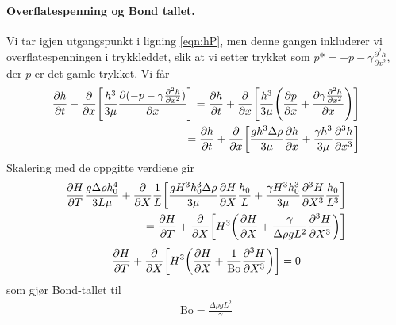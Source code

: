 \documentclass[12p,a4paper]{article}
\begin{document}
\paragraph{Overflatespenning og Bond tallet.}
Vi tar igjen utgangspunkt i ligning \ref{eqn:hP}, men denne gangen inkluderer vi overflatespenningen i trykkleddet, slik at vi setter trykket som $p* = -p -\gamma\frac{\partial^2 h}{\partial x^2}$, der $p$ er det gamle trykket. Vi får
\begin{align*}
    \frac{\partial h}{\partial t} - \frac{\partial}{\partial x}\qty[\frac{h^3}{3\mu}\frac{\partial(-p-\gamma\frac{\partial^2 h}{\partial x^2})}{\partial x}] =
    \frac{\partial h}{\partial t} + \frac{\partial}{\partial x}\qty[\frac{h^3}{3\mu}\qty(\frac{\partial p}{\partial x} + \frac{\partial \gamma\frac{\partial^2 h}{\partial x^2}}{\partial x})] \\
    = \frac{\partial h}{\partial t} + \frac{\partial}{\partial x}\qty[\frac{gh^3\Delta\rho}{3\mu}\frac{\partial h}{\partial x} + \frac {\gamma h^3}{3\mu}\frac{\partial^3 h}{\partial x^3}]
\end{align*}
Skalering med de oppgitte verdiene gir
\begin{align*}
    \frac{\partial H}{\partial T}\frac{g\Delta\rho h_0^4}{3L\mu} + \frac{\partial}{\partial X}\frac{1}{L}\qty[\frac{gH^3h_0^3\Delta\rho}{3\mu}\frac{\partial H}{\partial X}\frac{h_0}{L} + \frac{\gamma H^3h_0^3}{3\mu}\frac{\partial^3 H}{\partial X^3}\frac{h_0}{L^3}] \\
    = \frac{\partial H}{\partial T} + \frac{\partial}{\partial X}\qty[H^3\qty(\frac{\partial H}{\partial X} + \frac{\gamma}{\Delta\rho g L^2} \frac{\partial^3 H}{\partial X^3})]
\end{align*}
\begin{align}\label{eqn:H_Bo}
        \frac{\partial H}{\partial T} + \frac{\partial}{\partial X}\qty[H^3\qty(\frac{\partial H}{\partial X} + \frac{1}{\mathrm{Bo}} \frac{\partial^3 H}{\partial X^3})] = 0
\end{align}
som gjør Bond-tallet til
\begin{align*}
    \mathrm{Bo} = \frac{\Delta\rho g L^2}{\gamma}
\end{align*}
\end{document}
